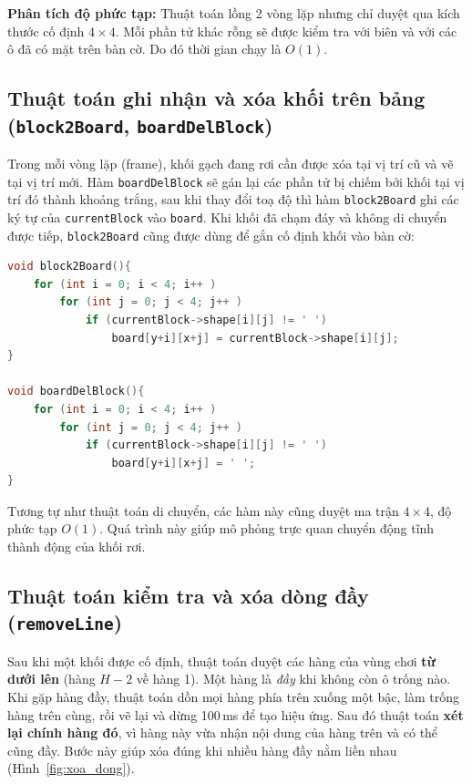 \textbf{Phân tích độ phức tạp:} Thuật toán lồng 2 vòng lặp nhưng chỉ duyệt qua kích thước cố định $4 \times 4$. Mỗi phần tử khác rỗng sẽ được kiểm tra với biên và với các ô đã có mặt trên bàn cờ. Do đó thời gian chạy là $O(1)$.

\subsection{Thuật toán ghi nhận và xóa khối trên bảng (\texttt{block2Board}, \texttt{boardDelBlock})}
Trong mỗi vòng lặp (frame), khối gạch đang rơi cần được xóa tại vị trí cũ và vẽ tại vị trí mới. Hàm \texttt{boardDelBlock} sẽ gán lại các phần tử bị chiếm bởi khối tại vị trí đó thành khoảng trắng, sau khi thay đổi toạ độ thì hàm \texttt{block2Board} ghi các ký tự của \texttt{currentBlock} vào \texttt{board}. Khi khối đã chạm đáy và không di chuyển được tiếp, \texttt{block2Board} cũng được dùng để gắn cố định khối vào bàn cờ:

\begin{lstlisting}[language=C++]
void block2Board(){
    for (int i = 0; i < 4; i++ )
        for (int j = 0; j < 4; j++ )
            if (currentBlock->shape[i][j] != ' ')
                board[y+i][x+j] = currentBlock->shape[i][j];
}

void boardDelBlock(){
    for (int i = 0; i < 4; i++ )
        for (int j = 0; j < 4; j++ )
            if (currentBlock->shape[i][j] != ' ')
                board[y+i][x+j] = ' ';
}
\end{lstlisting}

Tương tự như thuật toán di chuyển, các hàm này cũng duyệt ma trận $4\times4$, độ phức tạp $O(1)$. Quá trình này giúp mô phỏng trực quan chuyển động tĩnh thành động của khối rơi.

\subsection{Thuật toán kiểm tra và xóa dòng đầy (\texttt{removeLine})}

Sau khi một khối được cố định, thuật toán duyệt các hàng của vùng chơi \textbf{từ dưới lên} (hàng $H-2$ về hàng 1). Một hàng là \textit{đầy} khi không còn ô trống nào. Khi gặp hàng đầy, thuật toán dồn mọi hàng phía trên xuống một bậc, làm trống hàng trên cùng, rồi vẽ lại và dừng 100\,ms để tạo hiệu ứng. Sau đó thuật toán \textbf{xét lại chính hàng đó}, vì hàng này vừa nhận nội dung của hàng trên và có thể cũng đầy. Bước này giúp xóa đúng khi nhiều hàng đầy nằm liền nhau (Hình~\ref{fig:xoa_dong}).

